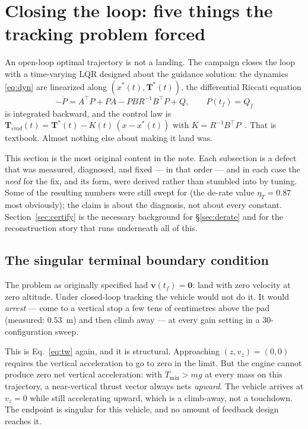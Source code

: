 \documentclass[11pt]{article}
\newcommand{\vvec}{\mathbf{v}}
\newcommand{\Tvec}{\mathbf{T}}
\newcommand{\Tmin}{T_{\min}}
\begin{document}
\section{Closing the loop: five things the tracking problem forced}
\label{sec:tracking}

An open-loop optimal trajectory is not a landing. The campaign closes the
loop with a time-varying LQR designed about the guidance solution: the
dynamics \eqref{eq:dyn} are linearized along $(x^\ast(t), \Tvec^\ast(t))$,
the differential Riccati equation
%
\begin{equation}
-\dot{P} = A^\top P + P A - P B R^{-1} B^\top P + Q,
\qquad P(t_f) = Q_f
\label{eq:dre}
\end{equation}
%
is integrated backward, and the control law is
$\Tvec_{cmd}(t) = \Tvec^\ast(t) - K(t)\,(x - x^\ast(t))$ with $K =
R^{-1}B^\top P$~\cite{anderson1990}. That is textbook. Almost nothing else
about making it land was.

This section is the most original content in the note. Each subsection is a
defect that was measured, diagnosed, and fixed --- in that order --- and in
each case the \emph{need} for the fix, and its form, were derived rather
than stumbled into by tuning. Some of the resulting numbers were still
swept for (the de-rate value $\eta_T = 0.87$ most obviously); the claim is
about the diagnosis, not about every constant. Section~\ref{sec:certify}
is the necessary background for \S\ref{sec:derate} and for the
reconstruction story that runs underneath all of this.

\subsection{The singular terminal boundary condition}
\label{sec:singular}

The problem as originally specified had $\vvec(t_f) = \mathbf{0}$: land with
zero velocity at zero altitude. Under closed-loop tracking the vehicle would
not do it. It would \emph{arrest} --- come to a vertical stop a few tens of
centimetres above the pad (measured: $0.53$~m) and then climb away --- at
every gain setting in a 30-configuration sweep.

This is Eq.~\eqref{eq:tw} again, and it is structural. Approaching
$(z, v_z) = (0,0)$ requires the vertical acceleration to go to zero in the
limit. But the engine cannot produce zero net vertical acceleration: with
$\Tmin > mg$ at every mass on this trajectory, a near-vertical thrust vector
always nets \emph{upward}. The vehicle arrives at $v_z = 0$ while still
accelerating upward, which is a climb-away, not a touchdown. The endpoint is
singular for this vehicle, and no amount of feedback design reaches it.
\end{document}
